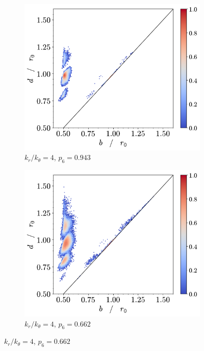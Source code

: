 \begin{figure}[tbp]
	\begin{subfigure}[b]{0.40\textwidth}
         \centering
         \includegraphics[width=\textwidth]{./figures/ph/t_k4_399_bs_pd.pdf}
         \caption{$k_r/k_\theta=4$, $p_6=0.943$}%
         \label{fig:bspde}
     \end{subfigure}
     \hspace{1cm}
        \begin{subfigure}[b]{0.40\textwidth}
         \centering
         \includegraphics[width=\textwidth]{./figures/ph/t_k4_257_bs_pd.pdf}
         \caption{$k_r/k_\theta=4$, $p_6=0.662$}%
         \label{fig:bspdf}
     \end{subfigure}
     

\end{figure}
